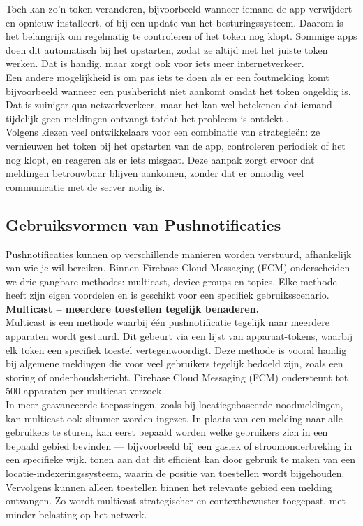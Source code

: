 Toch kan zo’n token veranderen, bijvoorbeeld wanneer iemand de app verwijdert en opnieuw installeert, of bij een update van het besturingssysteem. Daarom is het belangrijk om regelmatig te controleren of het token nog klopt. Sommige apps doen dit automatisch bij het opstarten, zodat ze altijd met het juiste token werken. Dat is handig, maar zorgt ook voor iets meer internetverkeer.\\

Een andere mogelijkheid is om pas iets te doen als er een foutmelding komt bijvoorbeeld wanneer een pushbericht niet aankomt omdat het token ongeldig is. Dat is zuiniger qua netwerkverkeer, maar het kan wel betekenen dat iemand tijdelijk geen meldingen ontvangt totdat het probleem is ontdekt \autocite{pushwoosh2025}.\\

Volgens \textcite{pushwoosh2025} kiezen veel ontwikkelaars voor een combinatie van strategieën: ze vernieuwen het token bij het opstarten van de app, controleren periodiek of het nog klopt, en reageren als er iets misgaat. Deze aanpak zorgt ervoor dat meldingen betrouwbaar blijven aankomen, zonder dat er onnodig veel communicatie met de server nodig is.\\

\subsection{Gebruiksvormen van Pushnotificaties}

Pushnotificaties kunnen op verschillende manieren worden verstuurd, afhankelijk van wie je wil bereiken. Binnen Firebase Cloud Messaging (FCM) onderscheiden we drie gangbare methodes: multicast, device groups en topics. Elke methode heeft zijn eigen voordelen en is geschikt voor een specifiek gebruiksscenario.\\

\textbf{Multicast – meerdere toestellen tegelijk benaderen.}\\
Multicast is een methode waarbij één pushnotificatie tegelijk naar meerdere apparaten wordt gestuurd. Dit gebeurt via een lijst van apparaat-tokens, waarbij elk token een specifiek toestel vertegenwoordigt. Deze methode is vooral handig bij algemene meldingen die voor veel gebruikers tegelijk bedoeld zijn, zoals een storing of onderhoudsbericht. Firebase Cloud Messaging (FCM) ondersteunt tot 500 apparaten per multicast-verzoek.\\

In meer geavanceerde toepassingen, zoals bij locatiegebaseerde noodmeldingen, kan multicast ook slimmer worden ingezet. In plaats van een melding naar alle gebruikers te sturen, kan eerst bepaald worden welke gebruikers zich in een bepaald gebied bevinden — bijvoorbeeld bij een gaslek of stroomonderbreking in een specifieke wijk. \textcite{ThuThuZan2018} tonen aan dat dit efficiënt kan door gebruik te maken van een locatie-indexeringssysteem, waarin de positie van toestellen wordt bijgehouden. Vervolgens kunnen alleen toestellen binnen het relevante gebied een melding ontvangen. Zo wordt multicast strategischer en contextbewuster toegepast, met minder belasting op het netwerk.\\

